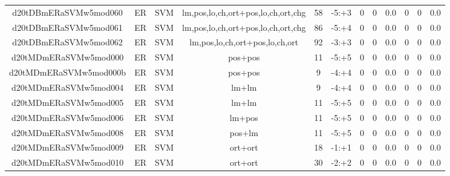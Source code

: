 \documentclass[a4paper]{article}
\begin{document}
\begin{landscape}
\begin{center}
\begin{tabular}{ |c|c|c|c|c|c|c|c|c|c|c|c|}
 	\small{ d20tDBmERaSVMw5mod060 } & ER & SVM & lm,pos,lo,ch,ort+pos,lo,ch,ort,chg  &  58 &  -5:+3  &  0 & 0 & 0.0  &  0 & 0 & 0.0 \\
 	

 
 	
 	\small{ d20tDBmERaSVMw5mod061 } & ER & SVM & lm,pos,lo,ch,ort+pos,lo,ch,ort,chg  &  86 &  -5:+4  &  0 & 0 & 0.0  &  0 & 0 & 0.0 \\
 	

 
 	
 	\small{ d20tDBmERaSVMw5mod062 } & ER & SVM & lm,pos,lo,ch,ort+pos,lo,ch,ort  &  92 &  -3:+3  &  0 & 0 & 0.0  &  0 & 0 & 0.0 \\
 	

 
 	
 	\small{ d20tMDmERaSVMw5mod000 } & ER & SVM & pos+pos  &  11 &  -5:+5  &  0 & 0 & 0.0  &  0 & 0 & 0.0 \\
 	

 
 	
 	\small{ d20tMDmERaSVMw5mod000b } & ER & SVM & pos+pos  &  9 &  -4:+4  &  0 & 0 & 0.0  &  0 & 0 & 0.0 \\
 	

 
 	
 	\small{ d20tMDmERaSVMw5mod004 } & ER & SVM & lm+lm  &  9 &  -4:+4  &  0 & 0 & 0.0  &  0 & 0 & 0.0 \\
 	

 
 	
 	\small{ d20tMDmERaSVMw5mod005 } & ER & SVM & lm+lm  &  11 &  -5:+5  &  0 & 0 & 0.0  &  0 & 0 & 0.0 \\
 	

 
 	
 	\small{ d20tMDmERaSVMw5mod006 } & ER & SVM & lm+pos  &  11 &  -5:+5  &  0 & 0 & 0.0  &  0 & 0 & 0.0 \\
 	

 
 	
 	\small{ d20tMDmERaSVMw5mod008 } & ER & SVM & pos+lm  &  11 &  -5:+5  &  0 & 0 & 0.0  &  0 & 0 & 0.0 \\
 	

 
 	
 	\small{ d20tMDmERaSVMw5mod009 } & ER & SVM & ort+ort  &  18 &  -1:+1  &  0 & 0 & 0.0  &  0 & 0 & 0.0 \\
 	

 
 	
 	\small{ d20tMDmERaSVMw5mod010 } & ER & SVM & ort+ort  &  30 &  -2:+2  &  0 & 0 & 0.0  &  0 & 0 & 0.0 \\
 	


\end{tabular}
\end{center}
\end{landscape}
\end{document}
